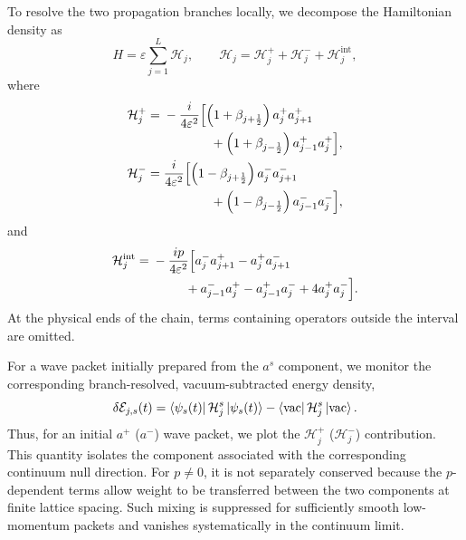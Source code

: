 \documentclass[reprint,amsmath,amssymb,aps,showkeys,superscriptaddress]{revtex4-2}
\begin{document}
To resolve the two propagation branches locally, we decompose the
Hamiltonian density as
\begin{equation}
  H
  =
  \varepsilon\sum_{j=1}^{L}\mathcal{H}_j,
  \qquad
  \mathcal{H}_j
  =
  \mathcal{H}_j^+
  +
  \mathcal{H}_j^-
  +
  \mathcal{H}_j^{\mathrm{int}},
  \label{eq:local_Hamiltonian_decomposition}
\end{equation}
where
\begin{align}
  \mathcal{H}_j^+
  ={}&
  -\frac{i}{4\varepsilon^2}
  \Bigl[
    \left(
      1+\beta_{j+\frac12}
    \right)
    a_j^+a_{j+1}^+
  \nonumber\\
  &\hspace{13mm}
    +
    \left(
      1+\beta_{j-\frac12}
    \right)
    a_{j-1}^+a_j^+
  \Bigr],
  \label{eq:H_density_plus}
  \\
  \mathcal{H}_j^-
  ={}&
  \frac{i}{4\varepsilon^2}
  \Bigl[
    \left(
      1-\beta_{j+\frac12}
    \right)
    a_j^-a_{j+1}^-
  \nonumber\\
  &\hspace{13mm}
    +
    \left(
      1-\beta_{j-\frac12}
    \right)
    a_{j-1}^-a_j^-
  \Bigr],
  \label{eq:H_density_minus}
\end{align}
and
\begin{align}
  \mathcal{H}_j^{\mathrm{int}}
  ={}&
  -\frac{i p}{4\varepsilon^2}
  \Bigl[
    a_j^-a_{j+1}^+
    -
    a_j^+a_{j+1}^-
  \nonumber\\
  &\hspace{9mm}
    +
    a_{j-1}^-a_j^+
    -
    a_{j-1}^+a_j^-
    +
    4a_j^+a_j^-
  \Bigr].
  \label{eq:H_density_interaction}
\end{align}
At the physical ends of the chain, terms containing operators
outside the interval are omitted.

For a wave packet initially prepared from the $a^s$ component, we
monitor the corresponding branch-resolved, vacuum-subtracted energy
density,
\begin{equation}
  \delta\mathcal{E}_{j,s}(t)
  =
  \bra{\psi_s(t)}
  \mathcal{H}_j^s
  \ket{\psi_s(t)}
  -
  \bra{\mathrm{vac}}
  \mathcal{H}_j^s
  \ket{\mathrm{vac}}.
  \label{eq:branch_resolved_energy}
\end{equation}
Thus, for an initial $a^+$ ($a^-$) wave packet, we plot the
$\mathcal{H}_j^+$ ($\mathcal{H}_j^-$) contribution. This quantity
isolates the component associated with the corresponding continuum
null direction. For $p\neq0$, it is not separately conserved
because the $p$-dependent terms allow weight to be transferred
between the two components at finite lattice spacing. Such mixing
is suppressed for sufficiently smooth low-momentum packets and
vanishes systematically in the continuum limit.
\end{document}
